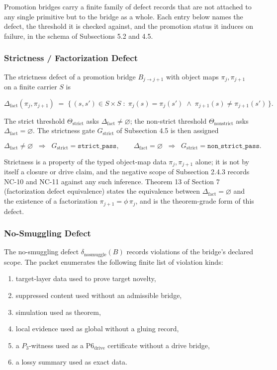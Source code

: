 \documentclass[11pt]{article}
\providecommand{\tightlist}{}
\theoremstyle{definition}
\begin{document}
Promotion bridges carry a finite family of defect records that are not attached to any single primitive but to the bridge as a whole. Each entry below names the defect, the threshold it is checked against, and the promotion status it induces on failure, in the schema of Subsections 5.2 and 4.5.

\subsubsection{Strictness / Factorization Defect}

The strictness defect of a promotion bridge \(B_{j\to j+1}\) with object maps \(\pi_j,\pi_{j+1}\) on a finite carrier \(S\) is

\[
\Delta_{\mathrm{fact}}(\pi_j,\pi_{j+1})\;=\;\{\,(s,s')\in S\times S\;:\;\pi_j(s)=\pi_j(s')\;\wedge\;\pi_{j+1}(s)\neq\pi_{j+1}(s')\,\}.
\]

The strict threshold \(\Theta_{\mathrm{strict}}\) asks \(\Delta_{\mathrm{fact}}\neq\varnothing\); the non-strict threshold \(\Theta_{\mathrm{nonstrict}}\) asks \(\Delta_{\mathrm{fact}}=\varnothing\). The strictness gate \(G_{\mathrm{strict}}\) of Subsection 4.5 is then assigned

\[
\Delta_{\mathrm{fact}}\neq\varnothing\;\;\Longrightarrow\;\;G_{\mathrm{strict}}=\texttt{strict\_pass},\qquad \Delta_{\mathrm{fact}}=\varnothing\;\;\Longrightarrow\;\;G_{\mathrm{strict}}=\texttt{non\_strict\_pass}.
\]

Strictness is a property of the typed object-map data \(\pi_j,\pi_{j+1}\) alone; it is not by itself a closure or drive claim, and the negative scope of Subsection 2.4.3 records NC-10 and NC-11 against any such inference. Theorem 13 of Section 7 (factorization defect equivalence) states the equivalence between \(\Delta_{\mathrm{fact}}=\varnothing\) and the existence of a factorization \(\pi_{j+1}=\phi\,\pi_j\), and is the theorem-grade form of this defect.

\subsubsection{No-Smuggling Defect}

The no-smuggling defect \(\delta_{\mathrm{nosmuggle}}(B)\) records violations of the bridge's declared scope. The packet enumerates the following finite list of violation kinds:

\begin{enumerate}
\def\labelenumi{\arabic{enumi}.}
\tightlist
\item
  target-layer data used to prove target novelty,
\item
  suppressed content used without an admissible bridge,
\item
  simulation used as theorem,
\item
  local evidence used as global without a gluing record,
\item
  a \(P_3\)-witness used as a \(\mathrm{P6}_{\mathrm{drive}}\) certificate without a drive bridge,
\item
  a lossy summary used as exact data.
\end{enumerate}
\end{document}
